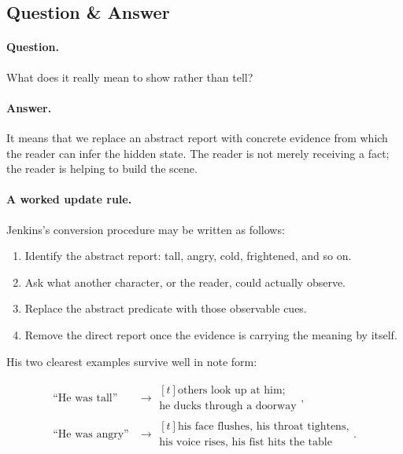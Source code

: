 \subsection{Question \& Answer}

\paragraph{Question.} What does it really mean to show rather than tell?

\paragraph{Answer.} It means that we replace an abstract report with concrete evidence from which the reader can infer the hidden state. The reader is not merely receiving a fact; the reader is helping to build the scene.

\paragraph{A worked update rule.} Jenkins's conversion procedure may be written as follows:

\begin{enumerate}
\item Identify the abstract report: tall, angry, cold, frightened, and so on.
\item Ask what another character, or the reader, could actually observe.
\item Replace the abstract predicate with those observable cues.
\item Remove the direct report once the evidence is carrying the meaning by itself.
\end{enumerate}

His two clearest examples survive well in note form:

\begin{align}
\text{``He was tall''} &\to
\begin{aligned}[t]
\text{others look up at him;} \\
\text{he ducks through a doorway}
\end{aligned},\\
\text{``He was angry''} &\to
\begin{aligned}[t]
\text{his face flushes, his throat tightens,} \\
\text{his voice rises, his fist hits the table}
\end{aligned}.
\end{align}

